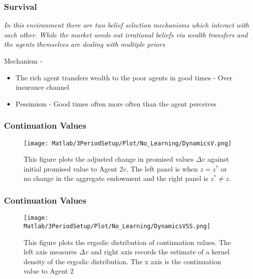 \documentclass{beamer}
\theoremstyle{Definition}
\begin{document}
\begin{frame}
\frametitle{Survival}
\emph{In this environment there are two belief selection mechanisms which interact with each other. While the market weeds out irrational beliefs via wealth transfers and the agents themselves are dealing with multiple priors}

Mechanism - 
\begin{itemize}
\item The rich agent transfers wealth to the poor agents in good times
  - Over insurance channel
\item Pessimism  - Good times often more often than the agent
  perceives
\end{itemize}



\end{frame}
\begin{frame}
\frametitle{Continuation Values}
   
\begin{figure}[htbp]
\centering
	  \texttt{[image: Matlab/3PeriodSetup/Plot/No\_Learning/DynamicsV.png]}

	\caption{This figure plots the adjusted change in promised values $\Delta v$ against initial promised value to Agent 2$v$.  The left panel is when $z=z^*$ or no change in the aggregate endowment and the right panel is $z^*\neq z$.}
	\label{fig:DynamicsV}
\end{figure} 

\end{frame}



\begin{frame}
\frametitle{Continuation Values}
\begin{figure}[htbp]
\centering
	  \texttt{[image: Matlab/3PeriodSetup/Plot/No\_Learning/DynamicsVSS.png]}

	\caption{This figure plots the ergodic distribution of continuation values. The left axis measures $\Delta v$ and right axis records the estimate of a kernel density of the ergodic distribution. The x axis is the continuation value to Agent 2}
	\label{fig:DynamicsVSS}
\end{figure} 


\end{frame}
\end{document}
